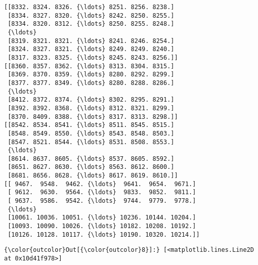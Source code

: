 \documentclass[11pt]{article}
\begin{document}
    \begin{Verbatim}[commandchars=\\\{\}]
[[8332. 8324. 8326. {\ldots} 8251. 8256. 8238.]
 [8334. 8327. 8320. {\ldots} 8242. 8250. 8255.]
 [8334. 8320. 8312. {\ldots} 8250. 8255. 8248.]
 {\ldots}
 [8319. 8321. 8321. {\ldots} 8241. 8246. 8254.]
 [8324. 8327. 8321. {\ldots} 8249. 8249. 8240.]
 [8317. 8323. 8325. {\ldots} 8245. 8243. 8256.]]
[[8360. 8357. 8362. {\ldots} 8313. 8304. 8315.]
 [8369. 8370. 8359. {\ldots} 8280. 8292. 8299.]
 [8377. 8377. 8349. {\ldots} 8280. 8288. 8286.]
 {\ldots}
 [8412. 8372. 8374. {\ldots} 8302. 8295. 8291.]
 [8392. 8392. 8368. {\ldots} 8312. 8321. 8299.]
 [8370. 8409. 8388. {\ldots} 8317. 8313. 8298.]]
[[8542. 8534. 8541. {\ldots} 8511. 8545. 8515.]
 [8548. 8549. 8550. {\ldots} 8543. 8548. 8503.]
 [8547. 8521. 8544. {\ldots} 8531. 8508. 8553.]
 {\ldots}
 [8614. 8637. 8605. {\ldots} 8537. 8605. 8592.]
 [8651. 8627. 8630. {\ldots} 8563. 8612. 8600.]
 [8681. 8656. 8628. {\ldots} 8617. 8619. 8610.]]
[[ 9467.  9548.  9462. {\ldots}  9641.  9654.  9671.]
 [ 9612.  9630.  9564. {\ldots}  9833.  9852.  9811.]
 [ 9637.  9586.  9542. {\ldots}  9744.  9779.  9778.]
 {\ldots}
 [10061. 10036. 10051. {\ldots} 10236. 10144. 10204.]
 [10093. 10090. 10026. {\ldots} 10182. 10208. 10192.]
 [10126. 10128. 10117. {\ldots} 10190. 10320. 10214.]]

    \end{Verbatim}

\begin{Verbatim}[commandchars=\\\{\}]
{\color{outcolor}Out[{\color{outcolor}8}]:} [<matplotlib.lines.Line2D at 0x10d41f978>]
\end{Verbatim}
            
    \begin{center}
    \end{center}
    { \hspace*{\fill} \\}
    
\end{document}
